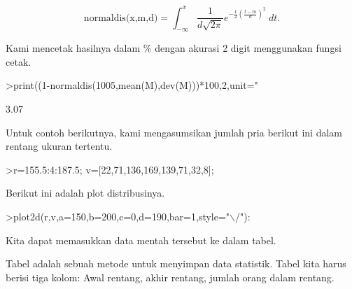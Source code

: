 \documentclass[12pt,Times new roman,letterpaper]{book}
\begin{document}
\begin{eulernootebook}
\begin{eulercomment}
\begin{eulercomment}
\begin{eulernootebook}
\begin{eulercomment}
\begin{eulercomment}
\begin{eulercomment}
\begin{eulercomment}
\begin{eulercomment}
\begin{eulercomment}
\begin{eulercomment}
\begin{eulercomment}
\end{eulercomment}
\begin{eulerformula}
\[
\text{normaldis(x,m,d)}=\int_{-\infty}^x \frac{1}{d\sqrt{2\pi}}e^{-\frac{1}{2}(\frac{t-m}{d})^2}\ dt.
\]
\end{eulerformula}
\begin{eulercomment}
Kami mencetak hasilnya dalam \% dengan akurasi 2 digit menggunakan
fungsi cetak.
\end{eulercomment}
\begin{eulerprompt}
>print((1-normaldis(1005,mean(M),dev(M)))*100,2,unit=" %
\end{eulerprompt}
\begin{euleroutput}
        3.07 %
\end{euleroutput}
\begin{eulercomment}
Untuk contoh berikutnya, kami mengasumsikan jumlah pria berikut ini
dalam rentang ukuran tertentu.
\end{eulercomment}
\begin{eulerprompt}
>r=155.5:4:187.5; v=[22,71,136,169,139,71,32,8];
\end{eulerprompt}
\begin{eulercomment}
Berikut ini adalah plot distribusinya.
\end{eulercomment}
\begin{eulerprompt}
>plot2d(r,v,a=150,b=200,c=0,d=190,bar=1,style="\(\backslash\)/"):
\end{eulerprompt}
\begin{eulercomment}
Kita dapat memasukkan data mentah tersebut ke dalam tabel.

Tabel adalah sebuah metode untuk menyimpan data statistik. Tabel kita
harus berisi tiga kolom: Awal rentang, akhir rentang, jumlah orang
dalam rentang.


\end{eulercomment}
\end{eulercomment}
\end{eulercomment}
\end{eulercomment}
\end{eulercomment}
\end{eulercomment}
\end{eulercomment}
\end{eulercomment}
\end{eulernootebook}
\end{eulercomment}
\end{eulercomment}
\end{eulernootebook}
\end{document}
